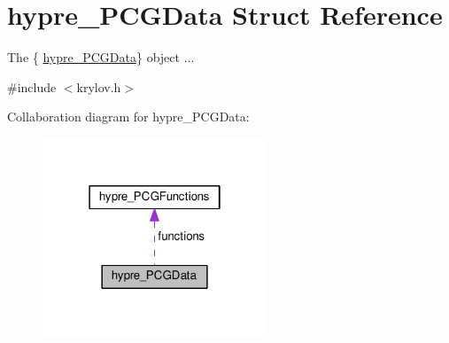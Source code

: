 \hypertarget{structhypre__PCGData}{}\section{hypre\+\_\+\+P\+C\+G\+Data Struct Reference}
\label{structhypre__PCGData}


The \{ \hyperlink{structhypre__PCGData}{hypre\+\_\+\+P\+C\+G\+Data}\} object ...  




{\ttfamily \#include $<$krylov.\+h$>$}



Collaboration diagram for hypre\+\_\+\+P\+C\+G\+Data\+:
\nopagebreak
\begin{figure}[H]
\begin{center}
\leavevmode
\includegraphics[width=190pt]{structhypre__PCGData__coll__graph}
\end{center}
\end{figure}
